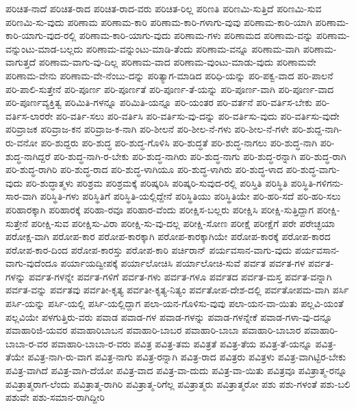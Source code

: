 {ಪರಿಚಿತ-ನಾದೆ
ಪರಿಚಿತ-ರಾದ
ಪರಿಚಿತ-ರಾದ-ವರು
ಪರಿಚಿತ-ರಿಲ್ಲ
ಪರಿಣತಿ
ಪರಿಣಮಿ-ಸುತ್ತಿದೆ
ಪರಿಣಮಿ-ಸುವ
ಪರಿಣಮಿ-ಸು-ವುದು
ಪರಿಣಾಮ
ಪರಿಣಾಮ-ಕಾರಿ
ಪರಿಣಾಮ-ಕಾರಿ-ಗಳಾಗು-ವುವು
ಪರಿಣಾಮ-ಕಾರಿ-ಯಾಗಿ
ಪರಿಣಾಮ-ಕಾರಿ-ಯಾಗು-ವುದ-ರಲ್ಲಿ
ಪರಿಣಾಮ-ಕಾರಿ-ಯಾಗು-ವುದು
ಪರಿಣಾಮ-ಗಳು
ಪರಿಣಾಮದ
ಪರಿಣಾಮ-ವನ್ನು
ಪರಿಣಾಮ-ವನ್ನುಂಟು-ಮಾಡ-ಬಲ್ಲದು
ಪರಿಣಾಮ-ವನ್ನುಂಟು-ಮಾಡಿ-ತೆಂದು
ಪರಿಣಾಮ-ವನ್ನೂ
ಪರಿಣಾಮ-ವಾಗಿ
ಪರಿಣಾಮ-ವಾಗುತ್ತದೆ
ಪರಿಣಾಮ-ವಾಗು-ವು-ದಿಲ್ಲ
ಪರಿಣಾಮ-ವಾದ
ಪರಿಣಾಮ-ವುಂಟು-ಮಾಡು-ವುದು
ಪರಿಣಾಮವೇ
ಪರಿಣಾಮ-ವೇನು
ಪರಿಣಾಮ-ವೇ-ನೆಂಬು-ದನ್ನು
ಪರಿತ್ಯಾಗ-ಮಾಡಿದ
ಪರಿಧಿ-ಯನ್ನು
ಪರಿ-ಪಕ್ವ-ವಾದ
ಪರಿ-ಪಾಲನೆ
ಪರಿ-ಪಾಲಿ-ಸುತ್ತೇನೆ
ಪರಿ-ಪೂರ್ಣ
ಪರಿ-ಪೂರ್ಣತೆ
ಪರಿ-ಪೂರ್ಣ-ತೆ-ಯನ್ನು
ಪರಿ-ಪೂರ್ಣ-ವಾಗಿ
ಪರಿ-ಪೂರ್ಣ-ವಾದ
ಪರಿ-ಪೂರ್ಣವ್ಯಕ್ತಿತ್ವ
ಪರಿಮಿತಿ-ಗಳನ್ನೂ
ಪರಿಮಿತಿ-ಯನ್ನೂ
ಪರಿ-ಯಂತರ
ಪರಿ-ವರ್ತನೆ
ಪರಿ-ವರ್ತಿಸ-ಬೇಕು
ಪರಿ-ವರ್ತಿಸ-ಲಾರರೇ
ಪರಿ-ವರ್ತಿ-ಸಲು
ಪರಿ-ವರ್ತಿಸಿ
ಪರಿ-ವರ್ತಿಸು-ವು-ದನ್ನು
ಪರಿ-ವರ್ತಿಸು-ವುದು
ಪರಿ-ವರ್ತಿಸು-ವುದೇ
ಪರಿವ್ರಾಜಕ
ಪರಿವ್ರಾಜ-ಕನ
ಪರಿವ್ರಾಜ-ಕ-ನಾಗಿ
ಪರಿ-ಶೀಲನೆ
ಪರಿ-ಶೀಲ-ನೆ-ಗಳು
ಪರಿ-ಶೀಲ-ನೆ-ಗಳೇ
ಪರಿ-ಶುದ್ದ-ನಾಗಿ-ರು-ವನೋ
ಪರಿ-ಶುದ್ದರು
ಪರಿ-ಶುದ್ಧ
ಪರಿ-ಶುದ್ಧ-ಗೊಳಿಸಿ
ಪರಿ-ಶುದ್ಧತೆ
ಪರಿ-ಶುದ್ಧ-ನಾಗಲು
ಪರಿ-ಶುದ್ಧ-ನಾಗಿ
ಪರಿ-ಶುದ್ಧ-ನಾಗಿದ್ದರೆ
ಪರಿ-ಶುದ್ಧ-ನಾಗಿ-ರ-ಬೇಕು
ಪರಿ-ಶುದ್ಧ-ನಾಗಿರು
ಪರಿ-ಶುದ್ಧ-ನಾಗು
ಪರಿ-ಶುದ್ಧ-ರನ್ನಾಗಿ
ಪರಿ-ಶುದ್ಧ-ರಾಗಿ
ಪರಿ-ಶುದ್ಧ-ರಾಗಿರಿ
ಪರಿ-ಶುದ್ಧ-ರಾದ
ಪರಿ-ಶುದ್ಧ-ಳಾಗಿಯೂ
ಪರಿ-ಶುದ್ಧ-ಳಾಗಿರು
ಪರಿ-ಶುದ್ಧ-ಳಾದ
ಪರಿ-ಶುದ್ಧ-ವಾಗು-ವುದು
ಪರಿ-ಶುದ್ಧಾತ್ಮಳು
ಪರಿಶ್ರಮ
ಪರಿಶ್ರಮಕ್ಕೆ
ಪರಿಷ್ಕರಿಸಿ
ಪರಿಷ್ಕರಿ-ಸುವುದ-ರಲ್ಲಿ
ಪರಿಸ್ತಿತಿ
ಪರಿಸ್ಥಿತಿ
ಪರಿಸ್ಥಿತಿ-ಗಳಿಗನು-ಸಾರ-ವಾಗಿ
ಪರಿಸ್ಥಿತಿ-ಗಳು
ಪರಿಸ್ಥಿತಿಗೆ
ಪರಿಸ್ಥಿತಿ-ಯಲ್ಲಿದ್ದೇನೆ
ಪರಿಸ್ಥಿತಿಯು
ಪರಿಸ್ಥಿತಿಯೇ
ಪರಿ-ಹರಿ-ಸದೆ
ಪರಿ-ಹರಿ-ಸಲು
ಪರಿಹಾರಕ್ಕಾಗಿ
ಪರಿಹಾರಕ್ಕೆ
ಪರಿಹಾ-ರವೂ
ಪರಿಹಾರ-ವೆಂದು
ಪರೀಕ್ಷಿಸ-ಬಲ್ಲರು
ಪರೀಕ್ಷಿಸಿ
ಪರೀಕ್ಷಿ-ಸುತ್ತಿದ್ದಾಗ
ಪರೀಕ್ಷಿ-ಸುತ್ತೇನೆ
ಪರೀಕ್ಷಿ-ಸುವ
ಪರೀಕ್ಷಿಸು-ವಿರಾ
ಪರೀಕ್ಷಿ-ಸು-ವು-ದಲ್ಲ
ಪರೀಕ್ಷಿ-ಸೋಣ
ಪರೀಕ್ಷೆ
ಪರೀಕ್ಷೆಗೆ
ಪರೇ
ಪರೇಚ್ಛಯಾ
ಪರೋಕ್ಷ-ವಾಗಿ
ಪರೋಪ-ಕಾರ
ಪರೋಪ-ಕಾರಕ್ಕಾಗಿ
ಪರೋಪ-ಕಾರಕ್ಕಾಗಿಯೇ
ಪರೋಪ-ಕಾರಕ್ಕೆ
ಪರೋಪ-ಕಾರದ
ಪರೋಪ-ಕಾರ-ದಿಂದ
ಪರೋಪ-ಕಾರಸ್ತು
ಪರೋಪ-ಕಾರಿ
ಪರ್ಚಿರಾನ್
ಪರ್ಯವಸಾನ-ವಾಗು-ವುದು
ಪರ್ಯವಸಾನ-ವಾಗು-ವುದೆಂದೂ
ಪರ್ಯಾಯದ್ವೀಪಕ್ಕೆ
ಪರ್ಯಾಲೋಚಿಸಿ
ಪರ್ಯಾಲೋಚಿ-ಸುವೆ
ಪರ್ವತ
ಪರ್ವತ-ಗಳ
ಪರ್ವತ-ಗಳನ್ನು
ಪರ್ವತ-ಗಳನ್ನೇ
ಪರ್ವತ-ಗಳಿಗೆ
ಪರ್ವತ-ಗಳು
ಪರ್ವತ-ಗಳೂ
ಪರ್ವತದ
ಪರ್ವತ-ಮಸ್ತ
ಪರ್ವತ-ವನ್ನಾಗಿ
ಪರ್ವತ-ವನ್ನು
ಪರ್ವತವು
ಪರ್ವತೀ-ಕೃತ್ಯ
ಪರ್ವತೀ-ಕೃತ್ಯ-ನಿತ್ಯಂ
ಪರ್ವತೋಪ-ದೇಶ-ದಲ್ಲಿ
ಪರ್ವತೋಪಮ-ವಾಗಿ
ಪರ್ಸಿ
ಪರ್ಸಿ-ಯನ್ನು
ಪರ್ಸಿ-ಯಲ್ಲಿ
ಪರ್ಸಿ-ಯಲ್ಲಿದ್ದಾಗ
ಪಲಾ-ಯನ-ಗೊಳಿಸು-ವುವು
ಪಲಾ-ಯನ-ವಾ-ಯಿತು
ಪಲ್ಲವಿ-ಯಂತೆ
ಪಲ್ಲವಿಯೇ
ಪಳಗುತ್ತಿರು-ವರು
ಪವಾಡ
ಪವಾಡ-ಗಳ
ಪವಾಡ-ಗಳನ್ನು
ಪವಾಡ-ಗಳನ್ನೇಕೆ
ಪವಾಡ-ಗಳಾ-ವು-ದನ್ನೂ
ಪವಾಹಾರಿಜಿ-ಯವರ
ಪವಾಹಾರಿಬಾಬನ
ಪವಾಹಾರಿ-ಬಾಬರ
ಪವಾಹಾರಿ-ಬಾಬಾ
ಪವಾಹಾರಿ-ಬಾಬಾರ
ಪವಾಹಾರಿ-ಬಾಬಾ-ರ-ವರ
ಪವಾಹಾರಿ-ಬಾಬಾ-ರ-ವರು
ಪವಿತ್ರ
ಪವಿತ್ರ-ತಮ
ಪವಿತ್ರತೆ
ಪವಿತ್ರ-ತೆಯ
ಪವಿತ್ರ-ತೆ-ಯನ್ನೂ
ಪವಿತ್ರ-ತೆಯೇ
ಪವಿತ್ರ-ನಾಗಿ-ರು-ವಾಗ
ಪವಿತ್ರ-ನಾಗು
ಪವಿತ್ರ-ರನ್ನಾಗಿ
ಪವಿತ್ರ-ರಾದ
ಪವಿತ್ರರು
ಪವಿತ್ರಳು
ಪವಿತ್ರ-ವಾಗಿಟ್ಟಿರ-ಬೇಕು
ಪವಿತ್ರ-ವಾಗಿದೆ
ಪವಿತ್ರ-ವಾಗಿ-ದೆಯೋ
ಪವಿತ್ರ-ವಾದ
ಪವಿತ್ರ-ವಾ-ದುದು
ಪವಿತ್ರ-ವಾ-ಯಿತು
ಪವಿತ್ರವೂ
ಪವಿತ್ರಾತ್ಮ-ರನ್ನೂ
ಪವಿತ್ರಾತ್ಮರಾಗ-ಲೆಂದು
ಪವಿತ್ರಾತ್ಮ-ರಾಗಿರಿ
ಪವಿತ್ರಾತ್ಮ-ರಿಗೆಲ್ಲ
ಪವಿತ್ರಾತ್ಮರು
ಪವಿತ್ರಾತ್ಮರೋ
ಪಶು
ಪಶು-ಗಳಂತೆ
ಪಶು-ಬಲಿ
ಪಶುವೇ
ಪಶು-ಸಮಾನ-ರಾಗಿದ್ದೀರಿ
}
